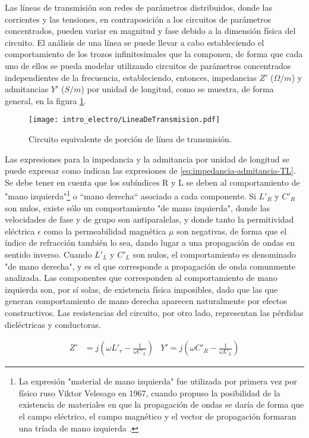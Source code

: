 Las líneas de transmisión son redes de parámetros distribuidos, donde las corrientes y las tensiones, en contraposición a los circuitos de parámetros concentrados, pueden variar en magnitud y fase debido a la dimensión física del circuito. El análisis de una línea se puede llevar a cabo estableciendo el comportamiento de los trozos infinitesimales que la componen, de forma que cada uno de ellos se pueda modelar utilizando circuitos de parámetros concentrados independientes de la frecuencia, estableciendo, entonces, impedancias $Z'$ ($\Omega/m$) y admitancias $Y'$ ($S/m$) por unidad de longitud, como se muestra, de forma general, en la figura \ref{fig:TL-equivalente}.

\begin{figure}[htp]
	\centering
	\texttt{[image: intro\_electro/LineaDeTransmision.pdf]}
	\caption{Circuito equivalente de porción de línea de transmisión.}
	\label{fig:TL-equivalente}
\end{figure}

Las expresiones para la impedancia y la admitancia por unidad de longitud se puede expresar como indican las expresiones de \ref{eq:impedancia-admitancia-TL}. Se debe tener en cuenta que los subíndices R y L se deben al comportamiento de "mano izquierda"\footnote{La expresión "material de mano izquierda" fue utilizada por primera vez por físico ruso Viktor Velesago en 1967, cuando propuso la posibilidad de la existencia de materiales en que la propagación de ondas se daría de forma que el campo eléctrico, el campo magnético y el vector de propagación formaran una tríada de mano izquierda \cite{Caloz}.} o ``mano derecha`` asociado a cada componente. Si $L'_R$ y $C'_R$ son nulos, existe sólo un comportamiento "de mano izquierda", donde las velocidades de fase y de grupo son antiparalelas, y donde tanto la permitividad eléctrica $\epsilon$ como la permeabilidad magnética $\mu$ son negativas, de forma que el índice de refracción también lo sea, dando lugar a una propagación de ondas en sentido inverso. Cuando $L'_L$ y $C'_L$ son nulos, el comportamiento es denominado "de mano derecha", y es el que corresponde a propagación de onda comunmente analizada. Las componentes que corresponden al comportamiento de mano izquierda son, por sí solas, de existencia física imposibles, dado que las que generan comportamiento de mano derecha aparecen naturalmente por efectos constructivos. Las resistencias del circuito, por otro lado, representan las pérdidas dieléctricas y conductoras.


\begin{align}
\label{eq:impedancia-admitancia-TL}
Z' &= j \left(\omega L'_r - \frac{1}{\omega C'_L} \right) & Y' =j \left(\omega C'_R - \frac{1}{\omega L'_L} \right)
\end{align}

